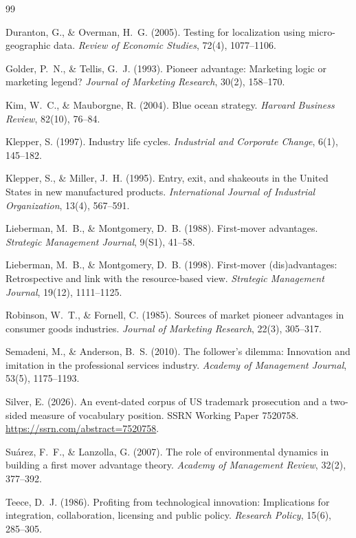 \begin{thebibliography}{99}

Duranton, G., \& Overman, H.~G. (2005). Testing for localization using
micro-geographic data. \emph{Review of Economic Studies}, 72(4),
1077--1106.

Golder, P.~N., \& Tellis, G.~J. (1993). Pioneer advantage: Marketing logic or
marketing legend? \emph{Journal of Marketing Research}, 30(2), 158--170.

Kim, W.~C., \& Mauborgne, R. (2004). Blue ocean strategy. \emph{Harvard
Business Review}, 82(10), 76--84.

Klepper, S. (1997). Industry life cycles. \emph{Industrial and Corporate
Change}, 6(1), 145--182.

Klepper, S., \& Miller, J.~H. (1995). Entry, exit, and shakeouts in the
United States in new manufactured products. \emph{International Journal
of Industrial Organization}, 13(4), 567--591.

Lieberman, M.~B., \& Montgomery, D.~B. (1988). First-mover advantages.
\emph{Strategic Management Journal}, 9(S1), 41--58.

Lieberman, M.~B., \& Montgomery, D.~B. (1998). First-mover (dis)advantages:
Retrospective and link with the resource-based view. \emph{Strategic
Management Journal}, 19(12), 1111--1125.

Robinson, W.~T., \& Fornell, C. (1985). Sources of market pioneer advantages
in consumer goods industries. \emph{Journal of Marketing Research}, 22(3),
305--317.

Semadeni, M., \& Anderson, B.~S. (2010). The follower's dilemma:
Innovation and imitation in the professional services industry.
\emph{Academy of Management Journal}, 53(5), 1175--1193.

Silver, E. (2026). An event-dated corpus of US trademark prosecution and
a two-sided measure of vocabulary position. SSRN Working Paper 7520758.
\url{https://ssrn.com/abstract=7520758}.

Su\'arez, F.~F., \& Lanzolla, G. (2007). The role of environmental
dynamics in building a first mover advantage theory. \emph{Academy of
Management Review}, 32(2), 377--392.

Teece, D.~J. (1986). Profiting from technological innovation:
Implications for integration, collaboration, licensing and public
policy. \emph{Research Policy}, 15(6), 285--305.

\end{thebibliography}
